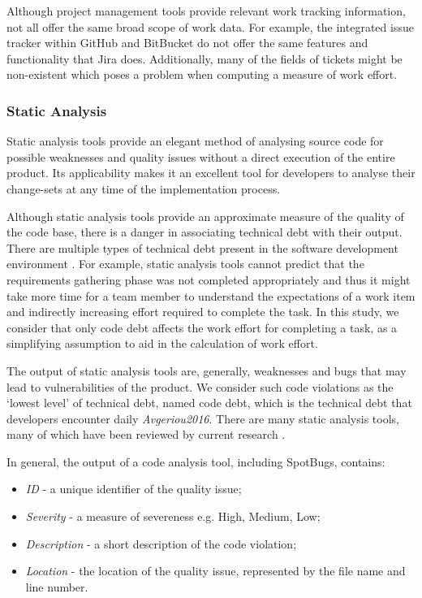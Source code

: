 \documentclass{mpaper}
\begin{document}
Although project management tools provide relevant work tracking information,
not all offer the same broad scope of work data. For example, the integrated
issue tracker within GitHub and BitBucket do not offer the same features and
functionality that Jira does. Additionally, many of the fields of tickets might
be non-existent which poses a problem when computing a measure of work effort.

\subsubsection*{Static Analysis}
\label{static-analysis}

Static analysis tools provide an elegant method of analysing source code for
possible weaknesses and quality issues without a direct execution of the entire
product. Its applicability makes it an excellent tool for developers to analyse
their change-sets at any time of the implementation process.

Although static analysis tools provide an approximate measure of the quality of
the code base, there is a danger in associating technical debt with their
output. There are multiple types of technical debt present in the software
development environment \cite{Li2015}. For example, static analysis tools cannot
predict that the requirements gathering phase was not completed appropriately
and thus it might take more time for a team member to understand the
expectations of a work item and indirectly increasing effort required to
complete the task. In this study, we consider that only code debt affects the
work effort for completing a task, as a simplifying assumption to aid in the
calculation of work effort. 

The output of static analysis tools are, generally, weaknesses and bugs that may
lead to vulnerabilities of the product. We consider such code violations as the
`lowest level' of technical debt, named code debt, which is the technical debt
that developers encounter daily \emph{Avgeriou2016}. There are many static
analysis tools, many of which have been reviewed by current research
\cite{Fontana2011}. 

In general, the output of a code analysis tool, including SpotBugs, contains:
\begin{itemize}
  \item \emph{ID} - a unique identifier of the quality issue;
  \item \emph{Severity} - a measure of severeness e.g. High, Medium, Low;
  \item \emph{Description} - a short description of the code violation;
  \item \emph{Location} - the location of the quality issue, represented by the
  file name and line number. 
\end{itemize}
\end{document}
